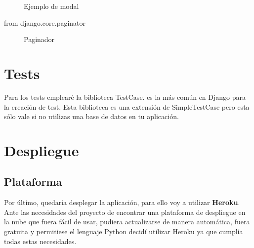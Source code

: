\begin{figure}[H]
  \centering
  \noindent{}
  \caption{}
\end{figure}

\begin{figure}[H]
  \centering
  \noindent{}
  \caption{}
\end{figure}

\begin{figure}[H]
  \centering
  \noindent{}
  \caption{Ejemplo de modal}
\end{figure}

from django.core.paginator 

\begin{figure}[H]
  \centering
  \noindent{}
  \caption{Paginador}
\end{figure}

\section{Tests}


Para los tests emplearé la biblioteca TestCase. es la más común en Django para la creación de test.
Esta biblioteca es una extensión de SimpleTestCase pero esta sólo vale si no utilizas una base de datos 
en tu aplicación.

\section{Despliegue}

\subsection{Plataforma}

Por último, quedaría desplegar la aplicación, para ello voy a utilizar \textbf{Heroku}.\\

Ante las necesidades del proyecto de encontrar una plataforma de despliegue en la nube que fuera fácil de usar, pudiera actualizarse de manera automática, fuera gratuita y permitiese el lenguaje Python decidí utilizar Heroku ya que cumplía todas estas necesidades. 

